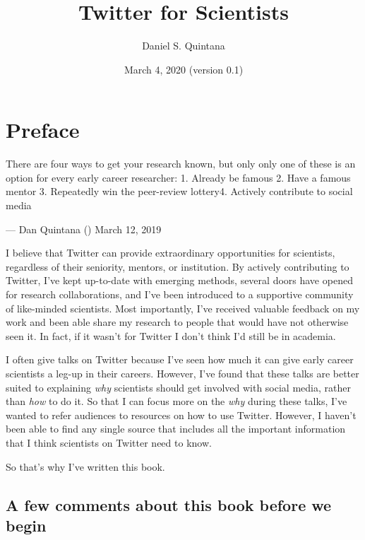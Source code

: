 \documentclass[]{book}
\title{Twitter for Scientists}
\author{Daniel S. Quintana}
\date{March 4, 2020 (version 0.1)}
\begin{document}
\maketitle

{
\setcounter{tocdepth}{1}
\tableofcontents
}
\hypertarget{preface}{%
\chapter*{Preface}\label{preface}}

There are four ways to get your research known, but only only one of these is an option for every early career researcher: 1. Already be famous 2. Have a famous mentor 3. Repeatedly win the peer-review lottery4. Actively contribute to social media

--- Dan Quintana (\citet{dsquintana}) March 12, 2019

I believe that Twitter can provide extraordinary opportunities for scientists, regardless of their seniority, mentors, or institution. By actively contributing to Twitter, I've kept up-to-date with emerging methods, several doors have opened for research collaborations, and I've been introduced to a supportive community of like-minded scientists. Most importantly, I've received valuable feedback on my work and been able share my research to people that would have not otherwise seen it. In fact, if it wasn't for Twitter I don't think I'd still be in academia.

I often give talks on Twitter because I've seen how much it can give early career scientists a leg-up in their careers. However, I've found that these talks are better suited to explaining \emph{why} scientists should get involved with social media, rather than \emph{how} to do it. So that I can focus more on the \emph{why} during these talks, I've wanted to refer audiences to resources on how to use Twitter. However, I haven't been able to find any single source that includes all the important information that I think scientists on Twitter need to know.

So that's why I've written this book.

\hypertarget{a-few-comments-about-this-book-before-we-begin}{%
\section*{A few comments about this book before we begin}\label{a-few-comments-about-this-book-before-we-begin}}
\end{document}
